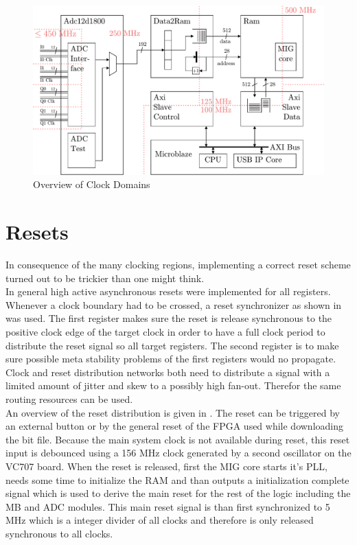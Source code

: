 \begin{figure}
  \centering
  \includegraphics[width=\textwidth]{figures/fpga_clock_domains_overview}
  \caption{Overview of Clock Domains}
  \label{fig:fpga_clock_domains}
\end{figure}

\section{Resets}
\label{sec:fpga_reset}

In consequence of the many clocking regions, implementing a correct
reset scheme turned out to be trickier than one might think. \\

In general high active asynchronous resets were implemented for all
registers. Whenever a clock boundary had to be crossed, a reset synchronizer
as shown in  was used. The first register
makes sure the reset is release synchronous to the positive clock edge
of the target clock in order to have a full clock period to distribute
the reset signal so all target registers. The second register is
to make sure possible meta stability problems of the first registers would
no propagate. Clock and reset distribution networks both need to
distribute a signal with a limited amount of jitter and skew to a possibly
high fan-out. Therefor the same routing resources can be used.  \\

An overview of the reset distribution is given in
. The reset can be triggered
by an external button or by the general reset of the \gls{FPGA}
used while downloading the bit file. Because the main system clock is
not available during reset, this reset input is debounced using a
156 MHz clock generated by a second oscillator on the VC707 board.
When the reset is released, first the \gls{MIG} core starts
it's \gls{PLL}, needs some time to initialize the \gls{RAM} and than
outputs a initialization complete signal which is used to derive the main reset
for the rest of the logic including the \gls{MB} and \gls{ADC} modules.
This main reset signal is than first synchronized to 5 MHz which is a
integer divider of all clocks and therefore is only released synchronous
to all clocks. \\


